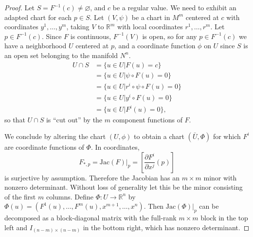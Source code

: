 \begin{proof}
Let $S = F^{-1}(c) \neq \varnothing$, and $c$ be a regular value. We
need to exhibit an adapted chart for each $p \in S$. Let $(V, \psi)$
be a chart in $M^m$ centered at $c$ with coordinates $y^1, \dots,
y^m$, taking $V$ to $\mathbb{R}^m$ with local coordinates $r^1, \dots,
r^m$. Let $p \in F^{-1}(c)$. Since $F$ is continuous, $F^{-1}(V)$ is
open, so for any $p \in F^{-1}(c)$ we have a neighborhood $U$ centered
at $p$, and a coordinate function $\phi$ on $U$ since $S$ is an open
set belonging to the manifold $N^n$.
\begin{align*}
   U \cap S
&= \{ u \in U \vert F(u) = c \} \\
&= \{ u \in U \vert \psi \circ F(u) = 0 \} \\
&= \{ u \in U \vert r^i \circ \psi \circ F(u) = 0 \} \\
&= \{ u \in U \vert y^i \circ F(u) = 0 \} \\
&= \{ u \in U \vert F^i(u) = 0 \},
\end{align*}
so that $U \cap S$ is ``cut out'' by the $m$ component functions of
$F$.

We conclude by altering the chart $(U, \phi)$ to obtain a chart
$(\bar{U}, \Phi)$ for which $F^i$ are coordinate functions of $\Phi$.
In coordinates,
$$
  F_{\ast, p}
= \mathrm{Jac}(F)|_p
= \left[\frac{\partial F^i}{\partial x^j}(p)\right]
$$
is surjective by assumption. Therefore the Jacobian has an $m \times
m$ minor with nonzero determinant. Without loss of generality let this
be the minor consisting of the first $m$ columns. Define
$\Phi: U \to \mathbb{R}^n$ by
$\Phi(u) = (F^1(u), \dots, F^m(u), x^{m+1}, \dots, x^n)$. Then
$\mathrm{Jac}(\Phi)|_p$
can be decomposed as a block-diagonal matrix with the full-rank
$m \times m$ block in the top left and $I_{(n - m) \times (n - m)}$ in
the bottom right, which has nonzero determinant.
\end{proof}

